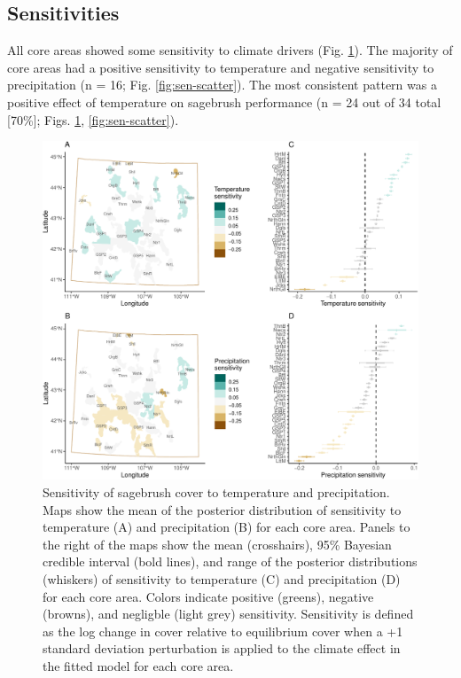\documentclass[
  12pt,
]{article}
\begin{document}
\hypertarget{sensitivities}{%
\subsection{Sensitivities}\label{sensitivities}}

All core areas showed some sensitivity to climate drivers (Fig. \ref{fig:sensitivities}).
The majority of core areas had a positive sensitivity to temperature and negative sensitivity to precipitation (n = 16; Fig. \ref{fig:sen-scatter}).
The most consistent pattern was a positive effect of temperature on sagebrush performance (n = 24 out of 34 total {[}70\%{]}; Figs. \ref{fig:sensitivities}, \ref{fig:sen-scatter}).

\begin{figure}
\centering
\includegraphics{sageCastManuscript_files/figure-latex/sensitivities-1.pdf}
\caption{\label{fig:sensitivities}Sensitivity of sagebrush cover to temperature and precipitation. Maps show the mean of the posterior distribution of sensitivity to temperature (A) and precipitation (B) for each core area. Panels to the right of the maps show the mean (crosshairs), 95\% Bayesian credible interval (bold lines), and range of the posterior distributions (whiskers) of sensitivity to temperature (C) and precipitation (D) for each core area. Colors indicate positive (greens), negative (browns), and negligble (light grey) sensitivity. Sensitivity is defined as the log change in cover relative to equilibrium cover when a +1 standard deviation perturbation is applied to the climate effect in the fitted model for each core area.}
\end{figure}
\end{document}
